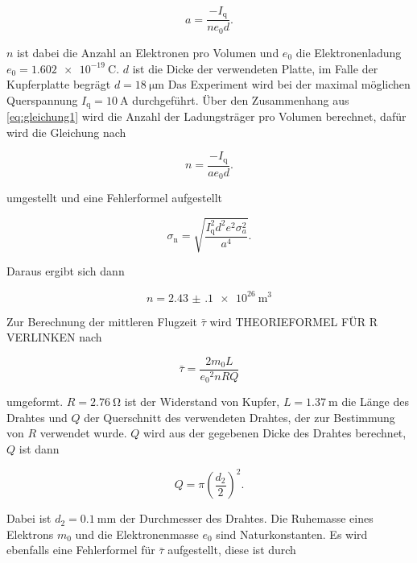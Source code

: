 \begin{equation}
    a = \frac{-I_\text{q}}{n e_0 d}.
    \label{eq:gleichung1}
\end{equation}

$n$ ist dabei die Anzahl an Elektronen pro Volumen und $e_0$ die Elektronenladung $e_0 = \SI{1.602e-19}{\coulomb}$. $d$ ist die Dicke der verwendeten Platte, im Falle der Kupferplatte begrägt $d = \SI{18}{\micro\meter}$
Das Experiment wird bei der maximal möglichen Querspannung $I_\text{q} = \SI{10}{\ampere}$ durchgeführt.
Über den Zusammenhang aus \autoref{eq:gleichung1} wird die Anzahl der Ladungsträger pro Volumen berechnet, dafür wird die Gleichung nach 

\begin{equation}
    n = \frac{-I_\text{q}}{a e_0 d}.
    \label{eq:gleichung2}
\end{equation}

umgestellt und eine Fehlerformel aufgestellt

\begin{equation}
    \sigma _\text{n} = \sqrt{\frac {I_\text{q}^{2} d^{2} e^{2} \sigma_{a}^{2} }{a^{4}}}.
    \label{eq:gleichung3}
\end{equation}

Daraus ergibt sich dann

\begin{equation}
    n = \SI{2.43(10)e26}{\cubic\meter}
    \label{eq:n1}
\end{equation}

Zur Berechnung der mittleren Flugzeit $\bar{\tau}$ wird THEORIEFORMEL FÜR R VERLINKEN nach

\begin{equation}
    \bar{\tau} = \frac{2m_0 L}{{e_0}^2 n R Q}
    \label{eq:tau}
\end{equation}

umgeformt.
$R = \SI{2.76}{\ohm}$ ist der Widerstand von Kupfer, $L = \SI{1.37}{\meter}$ die Länge des Drahtes und $Q$ der Querschnitt des verwendeten Drahtes, der zur Bestimmung von $R$ verwendet wurde.
$Q$ wird aus der gegebenen Dicke des Drahtes berechnet, $Q$ ist dann

\begin{equation}
    Q = \pi \left(\frac{d_2}{2}\right)^2.
    \label{eq:Q}
\end{equation}

Dabei ist $d_2 = \SI{0.1}{\milli\meter}$ der Durchmesser des Drahtes.
Die Ruhemasse eines Elektrons $m_0$ und die Elektronenmasse $e_0$ sind Naturkonstanten.\cite{physics_constants}
Es wird ebenfalls eine Fehlerformel für $\bar{\tau}$ aufgestellt, diese ist durch 

